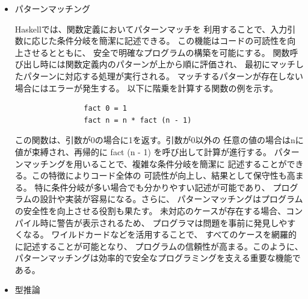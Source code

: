 \documentclass{cssspaper}
\begin{document}
\begin{itemize}
                \item パターンマッチング
                
                Haskellでは、関数定義においてパターンマッチを
                利用することで、入力引数に応じた条件分岐を簡潔に記述できる。
                この機能はコードの可読性を向上させるとともに、
                安全で明確なプログラムの構築を可能にする。
                関数呼び出し時には関数定義内のパターンが上から順に評価され、
                最初にマッチしたパターンに対応する処理が実行される。
                マッチするパターンが存在しない場合にはエラーが発生する。
                以下に階乗を計算する関数の例を示す。

                \begin{lstlisting}
                fact 0 = 1
                fact n = n * fact (n - 1)
                \end{lstlisting}

                この関数は、引数が0の場合に1を返す。引数が0以外の
                任意の値の場合はnに値が束縛され、再帰的に
                fact (n - 1) を呼び出して計算が進行する。
                パターンマッチングを用いることで、複雑な条件分岐を簡潔に
                記述することができる。この特徴によりコード全体の
                可読性が向上し、結果として保守性も高まる。
                特に条件分岐が多い場合でも分かりやすい記述が可能であり、
                プログラムの設計や実装が容易になる。さらに、
                パターンマッチングはプログラムの安全性を向上させる役割も果たす。
                未対応のケースが存在する場合、コンパイル時に警告が表示されるため、
                プログラマは問題を事前に発見しやすくなる。
                ワイルドカードなどを活用することで、
                すべてのケースを網羅的に記述することが可能となり、
                プログラムの信頼性が高まる。このように、
                パターンマッチングは効率的で安全なプログラミングを支える重要な機能である。

                \item 型推論
            

\end{itemize}
\end{document}
